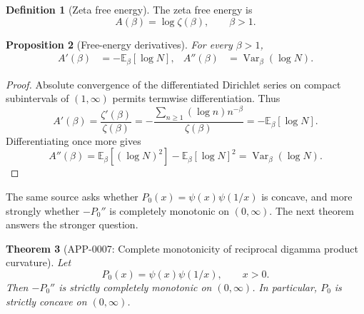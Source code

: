 \documentclass[11pt]{article}
\numberwithin{equation}{section}
\newtheorem{theorem}{Theorem}[section]
\newtheorem{proposition}[theorem]{Proposition}
\theoremstyle{definition}
\newtheorem{definition}[theorem]{Definition}
\theoremstyle{remark}
\DeclareMathOperator{\Var}{Var}
\newcommand{\E}{\mathbb E}
\newcommand{\1}{\mathbf 1}
\begin{document}
\begin{definition}[Zeta free energy]
\label{def:zeta-free-energy}
The zeta free energy is
\begin{equation}
\label{eq:zeta-free-energy}
A(\beta)=\log\zeta(\beta),\qquad \beta>1.
\end{equation}
\end{definition}

\begin{proposition}[Free-energy derivatives]
\label{prop:free-energy-derivatives}
For every \(\beta>1\),
\begin{align}
\label{eq:free-energy-derivatives}
A'(\beta)&=-\E_\beta[\log N],&
A''(\beta)&=\Var_\beta(\log N).
\end{align}
\end{proposition}

\begin{proof}
Absolute convergence of the differentiated Dirichlet series on compact subintervals of \((1,\infty)\) permits termwise differentiation.  Thus
\begin{equation}
\label{eq:first-free-derivative-proof}
A'(\beta)=\frac{\zeta'(\beta)}{\zeta(\beta)}
=-\frac{\sum_{n\ge1}(\log n)n^{-\beta}}{\zeta(\beta)}
=-\E_\beta[\log N].
\end{equation}
Differentiating once more gives
\begin{equation}
\label{eq:second-free-derivative-proof}
A''(\beta)=\E_\beta[(\log N)^2]-\E_\beta[\log N]^2
=\Var_\beta(\log N).
\end{equation}
\end{proof}

The same source asks whether \(P_0(x)=\psi(x)\psi(1/x)\) is concave, and more strongly whether \(-P_0''\) is completely monotonic on \((0,\infty)\).  The next theorem answers the stronger question.

\begin{theorem}[APP-0007: Complete monotonicity of reciprocal digamma product curvature]
\label{thm:reciprocal-digamma-product-complete-monotonicity}
Let
\begin{equation}
\label{eq:reciprocal-digamma-p0}
P_0(x)=\psi(x)\psi(1/x),\qquad x>0.
\end{equation}
Then \(-P_0''\) is strictly completely monotonic on \((0,\infty)\).  In particular, \(P_0\) is strictly concave on \((0,\infty)\).
\end{theorem}
\end{document}
